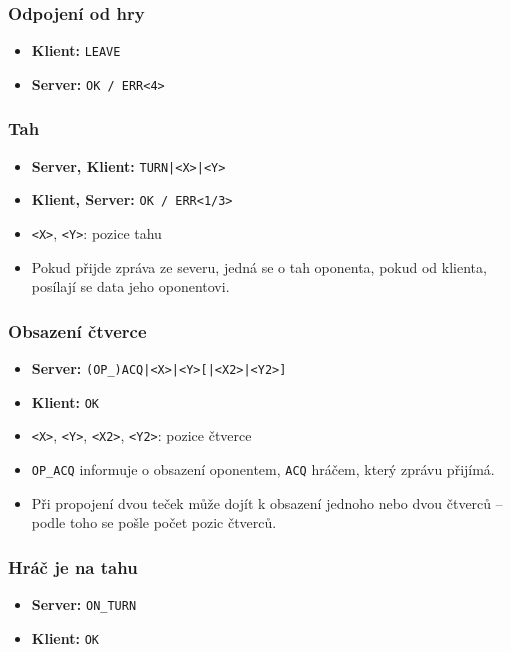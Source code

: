 \documentclass[11pt,a4paper]{article}
\begin{document}
\subsubsection*{Odpojení od hry}
\begin{itemize}
	\item \textbf{Klient:} \texttt{LEAVE}
	\item \textbf{Server:} \texttt{OK / ERR<4>}
\end{itemize}

\subsubsection*{Tah}
\begin{itemize}
	\item \textbf{Server, Klient:} \texttt{TURN|<X>|<Y>}
	\item \textbf{Klient, Server:} \texttt{OK / ERR<1/3>}
	\item \texttt{<X>}, \texttt{<Y>}: pozice tahu
	\item Pokud přijde zpráva ze severu, jedná se o tah oponenta, pokud od klienta, posílají se data jeho oponentovi.
\end{itemize}

\subsubsection*{Obsazení čtverce}
\begin{itemize}
	\item \textbf{Server:} \texttt{(OP\_)ACQ|<X>|<Y>[|<X2>|<Y2>]}
	\item \textbf{Klient:} \texttt{OK}
	\item \texttt{<X>}, \texttt{<Y>}, \texttt{<X2>}, \texttt{<Y2>}: pozice čtverce
	\item \texttt{OP\_ACQ} informuje o obsazení oponentem, \texttt{ACQ} hráčem, který zprávu přijímá.
	\item Při propojení dvou teček může dojít k obsazení jednoho nebo dvou čtverců -- podle toho se pošle počet pozic čtverců.
\end{itemize}

\subsubsection*{Hráč je na tahu}
\begin{itemize}
	\item \textbf{Server:} \texttt{ON\_TURN}
	\item \textbf{Klient:} \texttt{OK}
\end{itemize}
\end{document}
